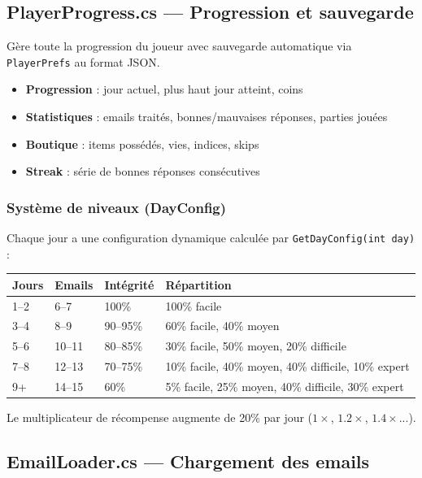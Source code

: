 \documentclass[12pt,a4paper]{article}
\begin{document}
\subsection{PlayerProgress.cs — Progression et sauvegarde}

Gère toute la progression du joueur avec sauvegarde automatique via \texttt{PlayerPrefs} au format JSON.

\begin{itemize}
    \item \textbf{Progression} : jour actuel, plus haut jour atteint, coins
    \item \textbf{Statistiques} : emails traités, bonnes/mauvaises réponses, parties jouées
    \item \textbf{Boutique} : items possédés, vies, indices, skips
    \item \textbf{Streak} : série de bonnes réponses consécutives
\end{itemize}

\subsubsection{Système de niveaux (DayConfig)}
Chaque jour a une configuration dynamique calculée par \texttt{GetDayConfig(int day)} :

\begin{longtable}{|l|l|l|l|}
\hline
\textbf{Jours} & \textbf{Emails} & \textbf{Intégrité} & \textbf{Répartition} \\
\hline
1--2 & 6--7 & 100\% & 100\% facile \\
\hline
3--4 & 8--9 & 90--95\% & 60\% facile, 40\% moyen \\
\hline
5--6 & 10--11 & 80--85\% & 30\% facile, 50\% moyen, 20\% difficile \\
\hline
7--8 & 12--13 & 70--75\% & 10\% facile, 40\% moyen, 40\% difficile, 10\% expert \\
\hline
9+ & 14--15 & 60\% & 5\% facile, 25\% moyen, 40\% difficile, 30\% expert \\
\hline
\end{longtable}

Le multiplicateur de récompense augmente de 20\% par jour ($1\times$, $1.2\times$, $1.4\times$...).

\subsection{EmailLoader.cs — Chargement des emails}
\end{document}
